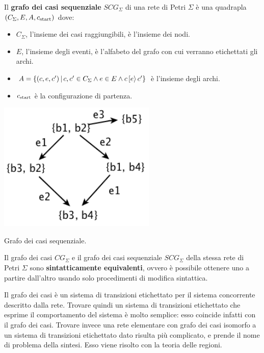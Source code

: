 \begin{defn}
    Il \textbf{grafo dei casi sequenziale} $SCG_{\Sigma}$ di una rete
    di Petri $\Sigma$ è una quadrapla $(C_{\Sigma}, E, A, c_{\textnormal{start}})$
    dove:
    \begin{itemize}
        \item $C_{\Sigma}$, l'insieme dei casi raggiungibili, è l'insieme dei
        nodi.
        \item $E$, l'insieme degli eventi, è l'alfabeto del grafo con cui
        verranno etichettati gli archi.
        \item $A = \left\{(c, e, c') \, | \, c, c' \in C_{\Sigma} \land
        e \in E \land c\,[e\rangle\,c'\right\}$
        è l'insieme degli archi.
        \item $c_{\textnormal{start}}$ è la configurazione di partenza.
    \end{itemize}
\end{defn}

\begin{marginfigure}
    \includegraphics[width=0.60\linewidth]{img/grafo_casi_sequenziale.png}
    \caption{Grafo dei casi sequenziale.}
    \label{fig:sequential_case_graph}
\end{marginfigure}

\begin{property}
    Il grafo dei casi $CG_{\Sigma}$ e il grafo dei casi sequenziale
    $SCG_{\Sigma}$ della stessa rete di Petri $\Sigma$ sono
    \textbf{sintatticamente equivalenti}, ovvero è possibile ottenere uno a
    partire dall'altro usando solo procedimenti di modifica sintattica.
\end{property}

\begin{rem}
    Il grafo dei casi è un sistema di transizioni etichettato per il sistema
    concorrente descritto dalla rete.
    Trovare quindi un sistema di transizioni etichettato che esprime il
    comportamento del sistema è molto semplice: esso coincide infatti con
    il grafo dei casi.
    Trovare invece una rete elementare con grafo dei casi isomorfo a un
    sistema di transizioni etichettato dato risulta più complicato,
    e prende il nome di problema della sintesi. Esso viene risolto con la
    teoria delle regioni.
\end{rem}


